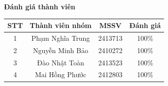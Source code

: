 \textbf{\Large Đánh giá thành viên}
\bigskip
\begin{center}
    \begin{tabular}{|c|c|c|c|} \hline 
         \textbf{STT} & \textbf{Thành viên nhóm}& \textbf{MSSV}    & \textbf{Đánh giá} \\ \hline 
        1   & Phạm Nghĩa Trung & 2413713 & 100\%  \\ \hline 
        2   & Nguyễn Minh Bảo & 2410272 & 100\% \\ \hline
        3   & Đào Nhật Toàn & 2413523 & 100\%  \\ \hline
        4   & Mai Hồng Phước & 2412803 & 100\% \\ \hline
    \end{tabular}
\end{center}





\newpage


